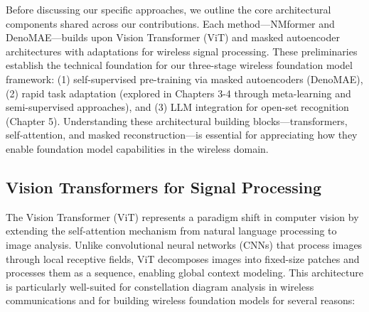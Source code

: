 Before discussing our specific approaches, we outline the core architectural components shared across our contributions. Each method—NMformer and DenoMAE—builds upon Vision Transformer (ViT) and masked autoencoder architectures with adaptations for wireless signal processing. These preliminaries establish the technical foundation for our three-stage wireless foundation model framework: (1) self-supervised pre-training via masked autoencoders (DenoMAE), (2) rapid task adaptation (explored in Chapters 3-4 through meta-learning and semi-supervised approaches), and (3) LLM integration for open-set recognition (Chapter 5). Understanding these architectural building blocks—transformers, self-attention, and masked reconstruction—is essential for appreciating how they enable foundation model capabilities in the wireless domain.

\subsection{Vision Transformers for Signal Processing}

The Vision Transformer (ViT) \cite{dosovitskiy2021vit} represents a paradigm shift in computer vision by extending the self-attention mechanism from natural language processing to image analysis. Unlike convolutional neural networks (CNNs) that process images through local receptive fields, ViT decomposes images into fixed-size patches and processes them as a sequence, enabling global context modeling. This architecture is particularly well-suited for constellation diagram analysis in wireless communications and for building wireless foundation models for several reasons:


